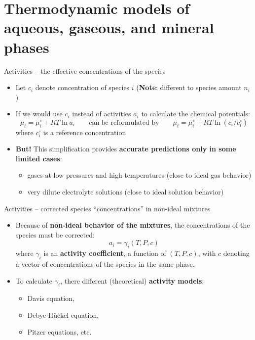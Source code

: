 \section{Thermodynamic models of aqueous, gaseous, and mineral phases}
%
%
\begin{frame}[<+->]{Activities -- the effective concentrations of the species}
\begin{itemize}
\item Let $c_{i}$ denote concentration of species $i$ (\textbf{Note}: different to species amount $n_i$)
\item If we would use $c_{i}$ instead of activities $a_{i}$ to calculate the chemical potentials:
\[
\mu_{i}=\mu_{i}^{\circ}+RT\ln a_{i} \qquad\text{can be reformulated by} \qquad \mu_{i}=\mu_{i}^{\circ}+RT\ln(c_{i}/c_{i}^{\circ})
\]
where $c_{i}^{\circ}$ is a reference concentration
%
\item \alert{\textbf{But!}} This simplification provides \textbf{accurate predictions only in some limited cases}:
%
\begin{itemize}
\item gases at low pressures and high temperatures \alert{(close to ideal gas behavior)}
\item very dilute electrolyte solutions \alert{(close to ideal solution behavior)}
\end{itemize}
\end{itemize}
\end{frame}
%
%
\begin{frame}{Activities -- corrected species “concentrations” in non-ideal mixtures}
\begin{itemize}
\item Because of \textbf{non-ideal behavior of the mixtures}, the concentrations
of the species must be corrected:
%
\[
a_{i}=\gamma_{i}(T,P,c)
\]
%
where $\gamma_{i}$ is an \alert{\textbf{activity coefficient}}, a function
of $(T,P,c)$, with $c$ denoting a vector of concentrations of the
species in the same phase. 
\pause
\item To calculate $\gamma_{i}$, there different (theoretical) \alert{\textbf{activity models}}:
\begin{itemize}
\item Davis equation,
\item Debye-H\"uckel equation,
\item Pitzer equations, etc.
\end{itemize}
\end{itemize}
\end{frame}
